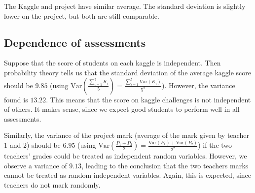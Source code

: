 \documentclass[a4paper]{article}
\newcommand{\Var}[1]{\text{Var}\left( {#1} \right)}
\begin{document}
	The Kaggle and project have similar average.
	The standard deviation is slightly lower on the project, but both are still comparable.
	
	\subsection{Dependence of assessments}
	Suppose that the score of students on each kaggle is independent.
	Then probability theory tells us that the standard deviation of the average kaggle score should be $9.85$ (using $\Var{\frac{\sum_{i=1}^{5} K_i}{5}} = \frac{\sum_{i=1}^{5} \Var{K_i}}{5^2}$).
	However, the variance found is $13.22$.
	This means that the score on kaggle challenges is not independent of others.
	It makes sense, since we expect good students to perform well in all assessments.
	
	Similarly, the variance of the project mark (average of the mark given by teacher 1 and 2) should be $6.95$ (using $\Var{\frac{P_1 + P_2}{2}} = \frac{\Var{P_1} + \Var{P_2}}{2^2}$) if the two teachers' grades could be treated as independent random variables.
	However, we observe a variance of $9.13$, leading to the conclusion that the two teachers marks cannot be treated as random independent variables.
	Again, this is expected, since teachers do not mark randomly.
	
\end{document}
